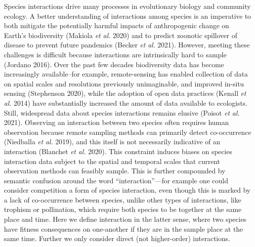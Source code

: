 \documentclass[11pt]{article}
\begin{document}
Species interactions drive many processes in evolutionary biology and
community ecology. A better understanding of interactions among species
is an imperative to both mitigate the potentially harmful impacts of
anthropogenic change on Earth's biodiversity (Makiola \emph{et al.}
2020) and to predict zoonotic spillover of disease to prevent future
pandemics (Becker \emph{et al.} 2021). However, meeting these challenges
is difficult because interactions are intrinsically hard to sample
(Jordano 2016). Over the past few decades biodiversity data has become
increasingly available--for example, remote-sensing has enabled
collection of data on spatial scales and resolutions previously
unimaginable, and improved in-situ sensing (Stephenson 2020), while the
adoption of open data practices (Kenall \emph{et al.} 2014) have
substantially increased the amount of data available to ecologists.
Still, widespread data about species interactions remains elusive
(Poisot \emph{et al.} 2021). Observing an interaction between two
species often requires human observation because remote sampling methods
can primarily detect co-occurrence (Niedballa \emph{et al.} 2019), and
this itself is not necessarily indicative of an interaction (Blanchet
\emph{et al.} 2020). This constraint induces biases on species
interaction data subject to the spatial and temporal scales that current
observation methods can feasibly sample. This is further compounded by
semantic confusion around the word ``interaction''---for example one
could consider competition a form of species interaction, even though
this is marked by a lack of co-occurrence between species, unlike other
types of interactions, like trophism or pollination, which require both
species to be together at the same place and time. Here we define
interaction in the latter sense, where two species have fitness
consequences on one-another if they are in the sample place at the same
time. Further we only consider direct (not higher-order) interactions.
\end{document}

